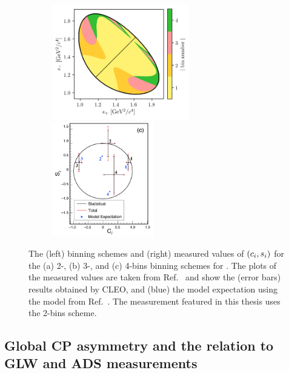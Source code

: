 \begin{figure}[p]
\begin{subfigure}{\columnwidth}
        \caption{}
        \label{fig:kskk_bins_3}
    \end{subfigure}
    \begin{subfigure}{\columnwidth}
        \centering
        \includegraphics[height=5cm]{figures/theory/binnings/KsKK_4bins.png}
        \includegraphics[height=5cm]{figures/theory/kskk_cisi_4.png}
        \caption{}
        \label{fig:kskk_bins_4}
    \end{subfigure}
    \caption{The (left) binning schemes and (right) measured values of $(c_i,s_i)$ for the (a) 2-, (b) 3-, and (c) 4-bins binning schemes for \DtoKsKK. The plots of the measured values are taken from Ref.~\cite{CLEOCISI} and show the (error bars) results obtained by CLEO, and (blue) the model expectation using the model from Ref.~\cite{BABAR2010}.
    The measurement featured in this thesis uses the 2-bins scheme.}
    \label{fig:kskk_bins}
\end{figure}





\subsection{Global CP asymmetry and the relation to GLW and ADS measurements} %
\label{sub:relation_to_glw_and_ads_measurements}



